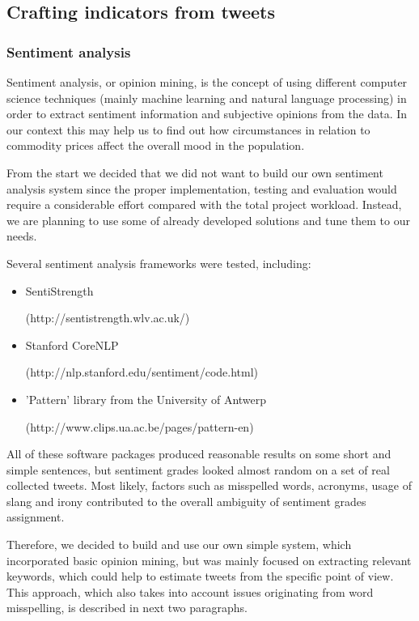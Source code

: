 \subsection*{Crafting indicators from tweets}

\subsubsection*{Sentiment analysis}

Sentiment analysis, or opinion mining, is the concept of using different computer science techniques (mainly machine learning and natural language processing) in order to extract sentiment information and subjective opinions from the data. In our context this may help us to find out how circumstances in relation to commodity prices affect the overall mood in the population. 

From the start we decided that we did not want to build our own sentiment analysis system since the proper implementation, testing and evaluation would require a considerable effort compared with the total project workload. Instead, we are planning to use some of already developed solutions and tune them to our needs. 

Several sentiment analysis frameworks were tested, including:

\begin{itemize}
\item SentiStrength \par (http://sentistrength.wlv.ac.uk/)

\item Stanford CoreNLP \par (http://nlp.stanford.edu/sentiment/code.html) 

\item 'Pattern' library from the University of Antwerp \par (http://www.clips.ua.ac.be/pages/pattern-en)
\end{itemize}

All of these software packages produced reasonable results on some short and simple sentences, but sentiment grades looked almost random on a set of real collected tweets. Most likely, factors such as misspelled words, acronyms, usage of slang and irony contributed to the overall ambiguity of sentiment grades assignment.

Therefore, we decided to build and use our own simple system, which incorporated basic opinion mining, but was mainly focused on extracting relevant keywords, which could help to estimate tweets from the specific point of view. This approach, which also takes into account issues originating from word misspelling, is described in next two paragraphs.

